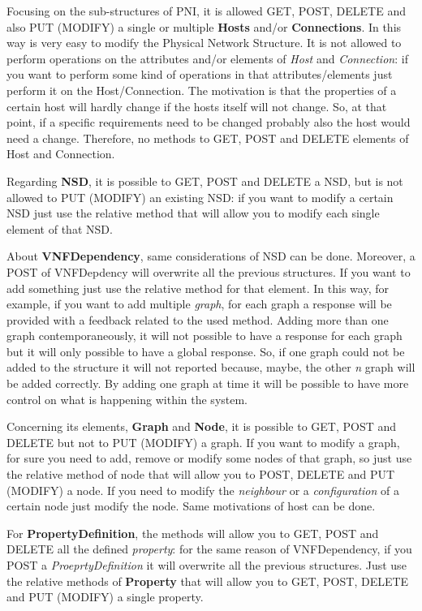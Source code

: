 \documentclass[11pt, english]{article}
\begin{document}
Focusing on the sub-structures of PNI, it is allowed GET, POST, DELETE and also PUT (MODIFY) a single or multiple \textbf{Hosts} and/or \textbf{Connections}. In this way is very easy to modify the Physical Network Structure. It is not allowed to perform operations on the attributes and/or elements of \textit{Host} and \textit{Connection}: if you want to perform some kind of operations in that attributes/elements just perform it on the Host/Connection. The motivation is that the properties of a certain host will hardly change if the hosts itself will not change. So, at that point, if a specific requirements need to be changed probably also the host would need a change. Therefore, no methods to GET, POST and DELETE elements of Host and Connection. 

Regarding \textbf{NSD}, it is possible to GET, POST and DELETE a NSD, but is not allowed to PUT (MODIFY) an existing NSD: if you want to modify a certain NSD just use the relative method that will allow you to modify each single element of that NSD.

About \textbf{VNFDependency}, same considerations of NSD can be done. Moreover, a POST of VNFDepdency will overwrite all the previous structures. If you want to add something just use the relative method for that element. In this way, for example, if you want to add multiple \textit{graph}, for each graph a response will be provided with a feedback related to the used method. Adding more than one graph contemporaneously, it will not possible to have a response for each graph but it will only possible to have a global response. So, if one graph could not be added to the structure it will not reported because, maybe, the other \textit{n} graph will be added correctly. By adding one graph at time it will be possible to have more control on what is happening within the system.

Concerning its elements, \textbf{Graph} and \textbf{Node}, it is possible to GET, POST and DELETE but not  to PUT (MODIFY) a graph. If you want to modify a graph, for sure you need to add, remove or modify some nodes of that graph, so just use the relative method of node that will allow you to POST, DELETE and PUT (MODIFY) a node. If you need to modify the \textit{neighbour} or a \textit{configuration} of a certain node just modify the node. Same motivations of host can be done.

For \textbf{PropertyDefinition}, the methods will allow you to GET, POST and DELETE all the defined \textit{property}: for the same reason of VNFDependency, if you POST a \textit{ProeprtyDefinition} it will overwrite all the previous structures. Just use the relative methods of \textbf{Property} that will allow you to GET, POST, DELETE and PUT (MODIFY) a single property.
\end{document}
